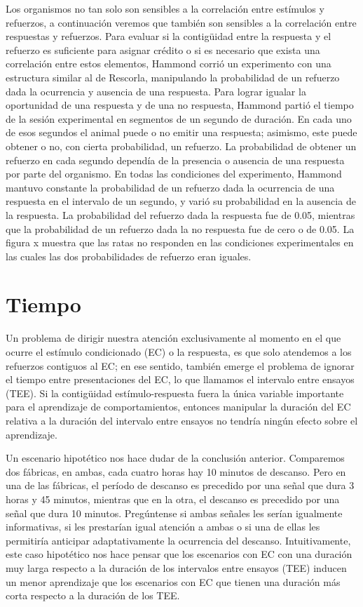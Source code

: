 \documentclass[
  a4paper,
  DIV=11,
  numbers=noendperiod]{scrreprt}
\begin{document}
Los organismos no tan solo son sensibles a la correlación entre
estímulos y refuerzos, a continuación veremos que también son sensibles
a la correlación entre respuestas y refuerzos. Para evaluar si la
contigüidad entre la respuesta y el refuerzo es suficiente para asignar
crédito o si es necesario que exista una correlación entre estos
elementos, Hammond corrió un experimento con una estructura similar al
de Rescorla, manipulando la probabilidad de un refuerzo dada la
ocurrencia y ausencia de una respuesta. Para lograr igualar la
oportunidad de una respuesta y de una no respuesta, Hammond partió el
tiempo de la sesión experimental en segmentos de un segundo de duración.
En cada uno de esos segundos el animal puede o no emitir una respuesta;
asimismo, este puede obtener o no, con cierta probabilidad, un refuerzo.
La probabilidad de obtener un refuerzo en cada segundo dependía de la
presencia o ausencia de una respuesta por parte del organismo. En todas
las condiciones del experimento, Hammond mantuvo constante la
probabilidad de un refuerzo dada la ocurrencia de una respuesta en el
intervalo de un segundo, y varió su probabilidad en la ausencia de la
respuesta. La probabilidad del refuerzo dada la respuesta fue de 0.05,
mientras que la probabilidad de un refuerzo dada la no respuesta fue de
cero o de 0.05. La figura x muestra que las ratas no responden en las
condiciones experimentales en las cuales las dos probabilidades de
refuerzo eran iguales.

\section{Tiempo}\label{tiempo}

Un problema de dirigir nuestra atención exclusivamente al momento en el
que ocurre el estímulo condicionado (EC) o la respuesta, es que solo
atendemos a los refuerzos contiguos al EC; en ese sentido, también
emerge el problema de ignorar el tiempo entre presentaciones del EC, lo
que llamamos el intervalo entre ensayos (TEE). Si la contigüidad
estímulo-respuesta fuera la única variable importante para el
aprendizaje de comportamientos, entonces manipular la duración del EC
relativa a la duración del intervalo entre ensayos no tendría ningún
efecto sobre el aprendizaje.

Un escenario hipotético nos hace dudar de la conclusión anterior.
Comparemos dos fábricas, en ambas, cada cuatro horas hay 10 minutos de
descanso. Pero en una de las fábricas, el período de descanso es
precedido por una señal que dura 3 horas y 45 minutos, mientras que en
la otra, el descanso es precedido por una señal que dura 10 minutos.
Pregúntense si ambas señales les serían igualmente informativas, si les
prestarían igual atención a ambas o si una de ellas les permitiría
anticipar adaptativamente la ocurrencia del descanso. Intuitivamente,
este caso hipotético nos hace pensar que los escenarios con EC con una
duración muy larga respecto a la duración de los intervalos entre
ensayos (TEE) inducen un menor aprendizaje que los escenarios con EC que
tienen una duración más corta respecto a la duración de los TEE.
\end{document}
